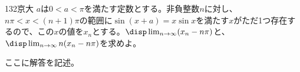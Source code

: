 \begin{thm}{132}{}{京大}
 $a$は$0<a<\pi$を満たす定数とする。非負整数$n$に対し、$n\pi<x<(n+1)\pi$の範囲に$\sin(x+a)=x\sin x$を満たす$x$がただ1つ存在するので、この$x$の値を$x_n$とする。$\disp \lim_{n\to\infty} (x_n-n\pi)$と、$\disp \lim_{n\to\infty} n(x_n-n\pi)$を求めよ。
\end{thm}

ここに解答を記述。